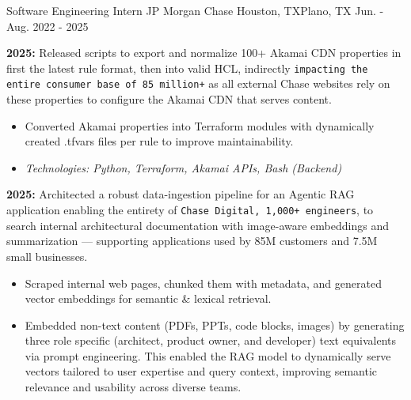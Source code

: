 

\begin{cventries}


    \cventry
    {Software Engineering Intern} %
    {JP Morgan Chase} %
    {Houston, TX\newline Plano, TX} %
    {Jun. - Aug. 2022 - 2025} %
    {
     \begin{cvitems} %
       \item{ 
       \textbf{2025:} Released scripts to export and normalize 100+ Akamai CDN properties in first the latest rule format, then into valid HCL, indirectly \texttt{impacting the entire consumer base of 85 million+} as all external Chase websites rely on these properties to configure the Akamai CDN that serves content.
       \begin{itemize}
       \item Converted Akamai properties into Terraform modules with dynamically created .tfvars files per rule to improve maintainability.
       \item \textit{Technologies: Python, Terraform, Akamai APIs, Bash (Backend)}
       \end{itemize}
       }
       \item {
       \textbf{2025:} Architected a robust data-ingestion pipeline for an Agentic RAG application enabling the entirety of \texttt{Chase Digital, 1,000+ engineers}, to search internal architectural documentation with image-aware embeddings and summarization — supporting applications used by 85M customers and 7.5M small businesses.
       \begin{itemize}
       \item Scraped internal web pages, chunked them with metadata, and generated vector embeddings for semantic \& lexical retrieval.
       \item Embedded non-text content (PDFs, PPTs, code blocks, images) by generating three role specific (architect, product owner, and developer) text equivalents via prompt engineering. This enabled the RAG model to dynamically serve vectors tailored to user expertise and query context, improving semantic relevance and usability across diverse teams.

\end{itemize}}
\end{cvitems}}
\end{cventries}
